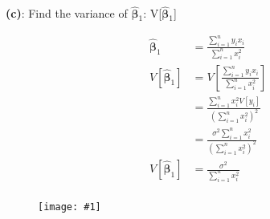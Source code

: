 \documentclass{article}
\newcommand{\mt}[1]{\ensuremath{#1}}
\newcommand{\bpth}[1]{\textbf{(#1)}}
\newcommand{\uw}[2]{#1\mt{_{#2}}}
\newcommand{\eqn}[1]{\[#1\]}
\newcommand{\splt}[1]{\begin{split}#1\end{split}}
\newcommand{\ssq}{\mt{\sigma^2}}
\newcommand{\bh}[1]{\mathbf{\hat{\text{$#1$}}}}
\newcommand{\bth}{\mt{\bh{\beta}}}
\newcommand{\vrn}[1]{V[#1]}
\newcommand{\wimg}[1]{
\begin{figure}[h]
  \texttt{[image: \#1]}
\end{figure}
}
\newcommand{\sumin}[1]{\mt{\sum_{i = 1}^n #1}}
\begin{document}
\bpth{c}: Find the variance of \uw{\bth}{1}: V[\uw{\bth}{1}]

\eqn{
	\splt{\bth_1 & = \frac{\sumin{y_ix_i}}{\sumin{x_i^2}} \\
	\vrn{\bth_1} & = \vrn{\frac{\sumin{y_ix_i}}{\sumin{x_i^2}}} \\
	& = \frac{\sumin{x_i^2\vrn{y_i}}}{(\sumin{x_i^2})^2} \\
	& = \frac{\ssq\sumin{x_i^2}}{(\sumin{x_i^2})^2} \\
	\vrn{\bth_1} & = \frac{\ssq}{\sumin{x_i^2}} \\}
}

\newpage

\wimg{THFP2}
\end{document}
